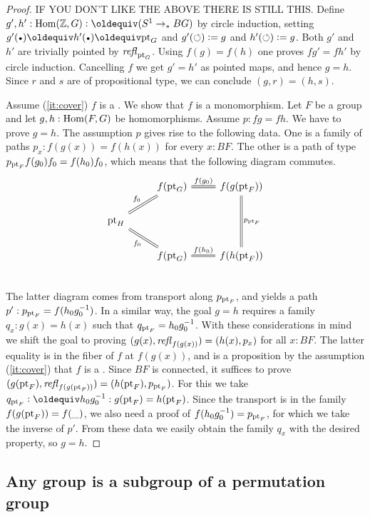 \begin{proof}
IF YOU DON'T LIKE THE ABOVE THERE IS STILL THIS.
Define $g',h': \Hom(\ZZ,G) \defeq (\Sc\ptdto BG)$
by circle induction, setting $g'(\base)\jdeq h'(\base)\jdeq\pt_G$
and $g'(\circlearrowleft)\vcentcolon= g$ and $h'(\circlearrowleft)\vcentcolon= g$. Both $g'$ and $h'$
are trivially pointed by $\mathop{\mathit{refl}_{\mathrm{pt}_G}}$. Using $f(g)=f(h)$ one
proves $fg'=fh'$ by circle induction. Cancelling $f$ we get $g'=h'$
as pointed maps, and hence $g=h$. 
Since $r$ and $s$ are of propositional type, we can conclude $(g,r) = (h,s)$.

Assume (\ref{it:cover}) $f$ is a \covering. We show that $f$ is a monomorphism.
Let $F$ be a group and let $g,h : \mathrm{Hom}(F,G)$ be homomorphisms.
Assume $p: fg=fh$. We have to prove $g=h$. The assumption $p$
gives rise to the following data. One is a family of paths $p_x : f(g(x)) = f(h(x))$
for every $x:BF$. The other is a path of type $p_{\mathrm{pt}_F} f(g_0) f_0 = f(h_0) f_0$,
which means that the following diagram commutes.
\[
\begin{tikzcd} 
           &f(\pt_G) \arrow[r, equal, "f(g_0)"] & f(g(\pt_F)) \arrow[dd, equal, "p_{\pt_F}"]\\
\pt_H \arrow[ur, equal, "f_0"] \arrow[dr, equal, "f_0"']\\
           &f(\pt_G) \arrow[r, equal, "f(h_0)"]& f(h(\pt_F))\\
\end{tikzcd}
\]
The latter diagram comes from transport along $p_{\mathrm{pt}_F}$,
and yields a path $p': p_{\mathrm{pt}_F} = f(h_0 g_0^{-1})$.
In a similar way, the goal $g=h$ requires a family $q_x : g(x) = h(x)$
such that $q_{\mathrm{pt}_F} = h_0 g_0^{-1}$. With these considerations in mind
we shift the goal to proving $(g(x),\mathop{\mathit{refl}_{f(g(x))}})=(h(x),p_x)$ for all $x:BF$.
The latter equality is in the fiber of $f$ at $f(g(x))$, and is a proposition
by the assumption (\ref{it:cover}) that $f$ is a \covering. Since $BF$ is connected, 
it suffices to prove $(g(\mathrm{pt}_F),\mathop{\mathit{refl}_{f(g(\mathrm{pt}_F))}})=(h(\mathrm{pt}_F),p_{\mathrm{pt}_F})$.
For this we take $q_{\pt_F} \defeq h_0 g_0^{-1}: g(\pt_F) = h(\pt_F)$. 
Since the transport is in the family $f(g(\mathrm{pt}_F))=f(\_)$,
we also need a proof of $f(h_0 g_0^{-1}) = p_{\mathrm{pt}_F}$, 
for which we take the inverse of $p'$. From these data we easily obtain
the family $q_x$ with the desired property, so $g=h$.
\end{proof}



\subsection{Any group is a subgroup of a permutation group}
\label{sec:groupssubperm}



